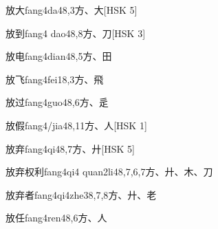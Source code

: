 \begin{EntryWithPhonetic}{放大}{fang4da4}{8,3}{⽅、⼤}[HSK 5]
\end{EntryWithPhonetic}

\begin{EntryWithPhonetic}{放到}{fang4 dao4}{8,8}{⽅、⼑}[HSK 3]
\end{EntryWithPhonetic}

\begin{EntryWithPhonetic}{放电}{fang4dian4}{8,5}{⽅、⽥}
\end{EntryWithPhonetic}

\begin{EntryWithPhonetic}{放飞}{fang4fei1}{8,3}{⽅、⾶}
\end{EntryWithPhonetic}

\begin{EntryWithPhonetic}{放过}{fang4guo4}{8,6}{⽅、⾡}
\end{EntryWithPhonetic}

\begin{EntryWithPhonetic}{放假}{fang4/jia4}{8,11}{⽅、⼈}[HSK 1]
\end{EntryWithPhonetic}

\begin{EntryWithPhonetic}{放弃}{fang4qi4}{8,7}{⽅、⼶}[HSK 5]
\end{EntryWithPhonetic}

\begin{EntryWithPhonetic}{放弃权利}{fang4qi4 quan2li4}{8,7,6,7}{⽅、⼶、⽊、⼑}
\end{EntryWithPhonetic}

\begin{EntryWithPhonetic}{放弃者}{fang4qi4zhe3}{8,7,8}{⽅、⼶、⽼}
\end{EntryWithPhonetic}

\begin{EntryWithPhonetic}{放任}{fang4ren4}{8,6}{⽅、⼈}
\end{EntryWithPhonetic}

